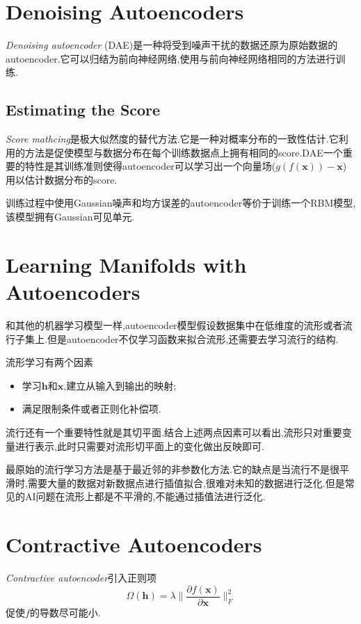 \section{Denoising Autoencoders}

\textit{Denoising autoencoder} (DAE)是一种将受到噪声干扰的数据还原为原始数据的autoencoder.它可以归结为前向神经网络,使用与前向神经网络相同的方法进行训练.

\subsection{Estimating the Score}

\textit{Score mathcing}是极大似然度的替代方法.它是一种对概率分布的一致性估计.它利用的方法是促使模型与数据分布在每个训练数据点上拥有相同的score.DAE一个重要的特性是其训练准则使得autoencoder可以学习出一个向量场($g(f(\bm x))-\bm x$)用以估计数据分布的score.

训练过程中使用Gaussian噪声和均方误差的autoencoder等价于训练一个RBM模型,该模型拥有Gaussian可见单元.

\section{Learning Manifolds with Autoencoders}

和其他的机器学习模型一样,autoencoder模型假设数据集中在低维度的流形或者流行子集上.但是autoencoder不仅学习函数来拟合流形,还需要去学习流行的结构.

流形学习有两个因素
\begin{itemize}
    \item 学习$\bm h$和$\bm x$,建立从输入到输出的映射;
    \item 满足限制条件或者正则化补偿项.
\end{itemize}

流行还有一个重要特性就是其切平面.结合上述两点因素可以看出,流形只对重要变量进行表示,此时只需要对流形切平面上的变化做出反映即可.

最原始的流行学习方法是基于最近邻的非参数化方法.它的缺点是当流行不是很平滑时,需要大量的数据对新数据点进行插值拟合,很难对未知的数据进行泛化.但是常见的AI问题在流形上都是不平滑的,不能通过插值法进行泛化.

\section{Contractive Autoencoders}

\textit{Contractive autoencoder}引入正则项
\begin{equation}
\Omega(\bm h)=\lambda\Big\|\frac{\partial f(\bm x)}{\partial\bm x}\Big\|^2_F
\end{equation}
促使$f$的导数尽可能小.

